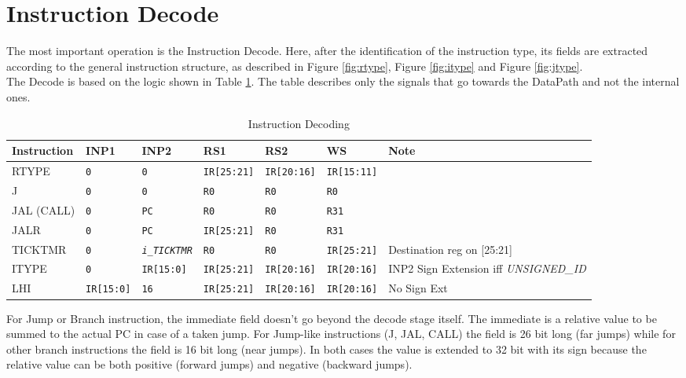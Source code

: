 \section{Instruction Decode}

The most important operation is the Instruction Decode. Here, after the identification of the instruction type, its fields are extracted according to the general instruction structure, as described in Figure \ref{fig:rtype}, Figure \ref{fig:itype} and Figure \ref{fig:jtype}.\\

The Decode is based on the logic shown in Table \ref{table:decode_instr}. The table describes only the signals that go towards the DataPath and not the internal ones.

\begin{table}[H]
    \centering
    \begin{tabularx}{\textwidth}{|l|l|l|l|l|l|X|}
        \hline
        \textbf{Instruction} & INP1 & INP2 & RS1 & RS2 & WS & Note\\
        \hline
        RTYPE & \texttt{0} & \texttt{0} & \texttt{IR[25:21]} & \texttt{IR[20:16]} & \texttt{IR[15:11]} & \\
        \hline
        J & \texttt{0} & \texttt{0} & \texttt{R0} & \texttt{R0} & \texttt{R0} & \\
        \hline
        JAL (CALL) & \texttt{0} & \texttt{PC} & \texttt{R0} & \texttt{R0} & \texttt{R31} & \\
        \hline
        JALR & \texttt{0} & \texttt{PC} & \texttt{IR[25:21]} & \texttt{R0} & \texttt{R31} & \\
        \hline
        TICKTMR & \texttt{0} & \texttt{\emph{i\_TICKTMR}} & \texttt{R0} & \texttt{R0} & \texttt{IR[25:21]} & Destination reg on [25:21]\\
        \hline
        ITYPE & \texttt{0} & \texttt{IR[15:0]} & \texttt{IR[25:21]} & \texttt{IR[20:16]} & \texttt{IR[20:16]} & INP2 Sign Extension iff \emph{UNSIGNED\_ID}\\
        \hline
        LHI & \texttt{IR[15:0]} & \texttt{16} & \texttt{IR[25:21]} & \texttt{IR[20:16]} & \texttt{IR[20:16]} & No Sign Ext\\
        \hline
    \end{tabularx}
    \caption{Instruction Decoding}
    \label{table:decode_instr}
\end{table}

For Jump or Branch instruction, the immediate field doesn't go beyond the decode stage itself. The immediate is a relative value to be summed to the actual PC in case of a taken jump. For Jump-like instructions (J, JAL, CALL) the field is 26 bit long (far jumps) while for other branch instructions the field is 16 bit long (near jumps). In both cases the value is extended to 32 bit with its sign because the relative value can be both positive (forward jumps) and negative (backward jumps).

